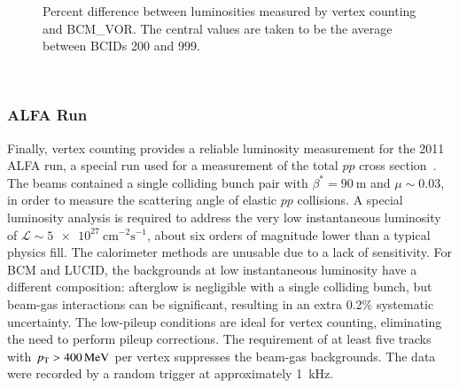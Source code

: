 \begin{figure}[h]
	\centering
	\caption{Percent difference between luminosities measured by vertex counting and BCM\_VOR. The central values are taken to be the average between BCIDs 200 and 999.}
	\label{fig:reco-luminosity-vertexing-muscan}
\end{figure}

\ 

\subsubsection{ALFA Run}

Finally, vertex counting provides a reliable luminosity measurement for the 2011 ALFA run, a special run used for a measurement of the total $pp$ cross section~\cite{TheATLASCollaboration:2014joa}. The beams contained a single colliding bunch pair with $\beta^{*}=\SI{90}{\meter}$ and $\mu\sim0.03$, in order to measure the scattering angle of elastic $pp$ collisions. A special luminosity analysis is required to address the very low instantaneous luminosity of $\mathcal{L}\sim\SI[per-mode=symbol]{5e27}{\centi\meter\tothe{-2}\second\tothe{-1}}$, about six orders of magnitude lower than a typical physics fill. The calorimeter methods are unusable due to a lack of sensitivity. For BCM and LUCID, the backgrounds at low instantaneous luminosity have a different composition: afterglow is negligible with a single colliding bunch, but beam-gas interactions can be significant, resulting in an extra 0.2\% systematic uncertainty. The low-pileup conditions are ideal for vertex counting, eliminating the need to perform pileup corrections. The requirement of at least five tracks with $p_{\text{T}}>\SI{400}{\mega\electronvolt}$ per vertex suppresses the beam-gas backgrounds. The data were recorded by a random trigger at approximately \SI{1}{\kilo\hertz}. 


